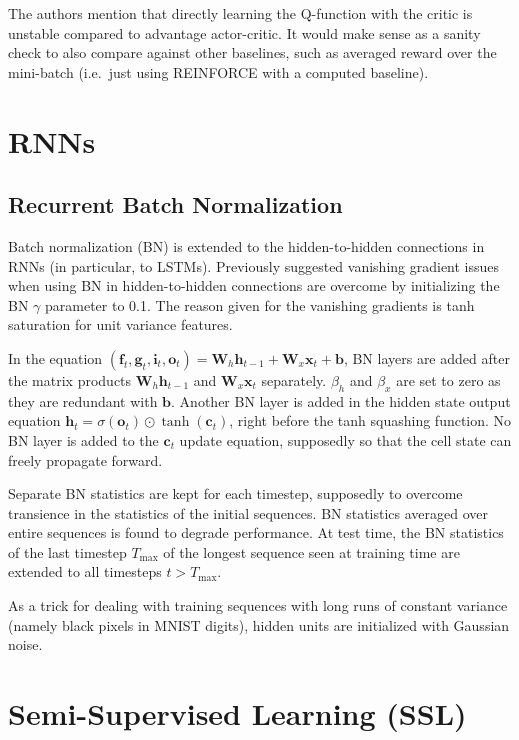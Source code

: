 \documentclass[a4paper, 12pt]{article}
\begin{document}
The authors mention that directly learning the Q-function with the critic is
unstable compared to advantage actor-critic. It would make sense as a sanity
check to also compare against other baselines, such as averaged reward over the
mini-batch (i.e.\ just using REINFORCE with a computed baseline).


\section{RNNs}

\subsection{Recurrent Batch
            Normalization~\citet{DBLP:journals/corr/CooijmansBLC16}}

Batch normalization (BN) is extended to the hidden-to-hidden connections in
RNNs (in particular, to LSTMs). Previously suggested vanishing gradient issues
when using BN in hidden-to-hidden connections are overcome by initializing the
BN $\gamma$ parameter to 0.1. The reason given for the vanishing gradients is
tanh saturation for unit variance features.

In the equation
$(\mathbf{f}_t, \mathbf{g}_t, \mathbf{i}_t, \mathbf{o}_t) =
\mathbf{W}_h \mathbf{h}_{t - 1} + \mathbf{W}_x \mathbf{x}_t + \mathbf{b}$,
BN layers are added after the matrix products
$\mathbf{W}_h \mathbf{h}_{t - 1}$ and $\mathbf{W}_x \mathbf{x}_t$ separately.
$\beta_h$ and $\beta_x$ are set to zero as they are redundant with
$\mathbf{b}$. Another BN layer is added in the hidden state output equation
$\mathbf{h}_t = \sigma{(\mathbf{o}_t)} \odot \tanh{(\mathbf{c}_t)}$,
right before the tanh squashing function. No BN layer is added to the
$\mathbf{c}_t$ update equation, supposedly so that the cell state can freely
propagate forward.

Separate BN statistics are kept for each timestep, supposedly to overcome
transience in the statistics of the initial sequences. BN statistics averaged
over entire sequences is found to degrade performance. At test time, the BN
statistics of the last timestep $T_{\max}$ of the longest sequence seen at
training time are extended to all timesteps $t > T_{\max}$.

As a trick for dealing with training sequences with long runs of constant
variance (namely black pixels in MNIST digits), hidden units are initialized
with Gaussian noise.


\section{Semi-Supervised Learning (SSL)}
\end{document}

